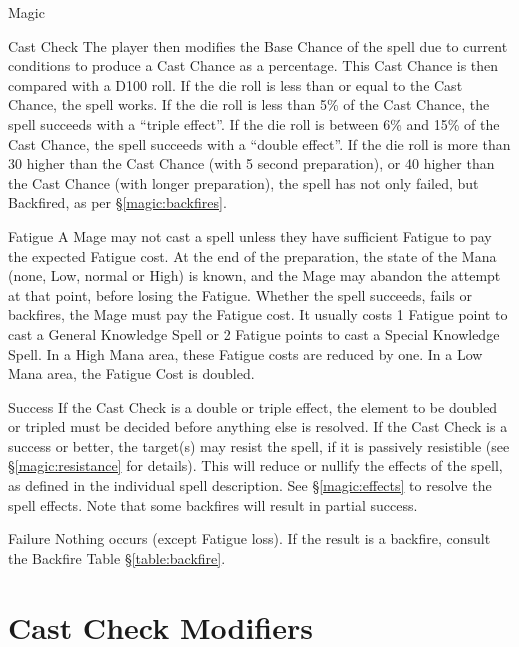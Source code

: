 \begin{Chapter}{Magic}
\begin{Description}
\item[Cast Check] The player then modifies the Base Chance of the
  spell due to current conditions to produce a Cast Chance as a
  percentage.  This Cast Chance is then compared with a D100 roll.  If
  the die roll is less than or equal to the Cast Chance, the spell
  works.  If the die roll is less than 5\% of the Cast Chance, the
  spell succeeds with a “triple effect”.  If the die roll is between
  6\% and 15\% of the Cast Chance, the spell succeeds with a “double
  effect”.  If the die roll is more than 30 higher than the Cast
  Chance (with 5 second preparation), or 40 higher than the Cast
  Chance (with longer preparation), the spell has not only failed, but
  Backfired, as per \S\ref{magic:backfires}.

\item[Fatigue] A Mage may not cast a spell unless they have sufficient
  Fatigue to pay the expected Fatigue cost.  At the end of the
  preparation, the state of the Mana (none, Low, normal or High) is
  known, and the Mage may abandon the attempt at that point, before
  losing the Fatigue.  Whether the spell succeeds, fails or backfires,
  the Mage must pay the Fatigue cost.  It usually costs 1 Fatigue point
  to cast a General Knowledge Spell or 2 Fatigue points to cast a
  Special Knowledge Spell.  In a High Mana area, these Fatigue costs
  are reduced by one.  In a Low Mana area, the Fatigue Cost is
  doubled.

\item[Success] If the Cast Check is a double or triple effect, the
  element to be doubled or tripled must be decided before anything
  else is resolved.  If the Cast Check is a success or better, the
  target(s) may resist the spell, if it is passively resistible (see
  \S\ref{magic:resistance} for details).  This will reduce or nullify
  the effects of the spell, as defined in the individual spell
  description. See \S\ref{magic:effects} to resolve the spell
  effects. Note that some backfires will result in partial success.

\item[Failure] Nothing occurs (except Fatigue loss).  If the result is
  a backfire, consult the Backfire Table \S\ref{table:backfire}.

\end{Description}


\section{Cast Check Modifiers}
\label{magic:modifiers}


\end{Chapter}

